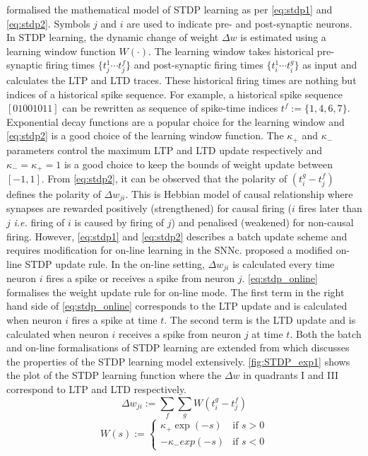 \citet{gerstner1996neuronal, song2000competitive} formalised the mathematical model of STDP learning as per \equationnames \ref{eq:stdp1} and \ref{eq:stdp2}. Symbols $j$ and $i$ are used to indicate pre- and post-synaptic neurons. In STDP learning, the dynamic change of weight $\Delta w$ is estimated using a learning window function $W(\cdot)$. The learning window takes historical pre-synaptic firing times $\{t_j^1 \cdots t_j^f\}$ and post-synaptic firing times $\{t_i^1\cdots t_i^g\}$ as input and calculates the LTP and LTD traces. These historical firing times are nothing but indices of a historical spike sequence. For example, a historical spike sequence $[01001011]$ can be rewritten as sequence of spike-time indices $t^f :=\{1, 4, 6, 7\}$. Exponential decay functions are a popular choice for the learning window and \equationname \ref{eq:stdp2} is a good choice of the learning window function. The $\kappa_+$ and $\kappa_-$ parameters control the maximum LTP and LTD update respectively and $\kappa_-=\kappa_+=1$ is a good choice to keep the bounds of weight update between $[-1, 1]$. From \equationname \ref{eq:stdp2}, it can be observed that the polarity of $(t^g_i-t^f_j)$ defines the polarity of $\Delta w_{ji}$. This is Hebbian model of causal relationship where synapses are rewarded positively (strengthened) for causal firing ($i$ fires later than $j$ \emph{i.e.} firing of $i$ is caused by firing of $j$) and penalised (weakened) for non-causal firing. However, \equationnames \ref{eq:stdp1} and \ref{eq:stdp2} describes a batch update scheme and requires modification for on-line learning in the SNNc. \citet{sjostrom2010spike} proposed a modified on-line STDP update rule. In the on-line setting, $\Delta w_{ji}$ is calculated every time neuron $i$ fires a spike or receives a spike from neuron $j$. \equationname \ref{eq:stdp_online} formalises the weight update rule for on-line mode. The first term in the right hand side of \equationname \ref{eq:stdp_online} corresponds to the LTP update and is calculated when neuron $i$ fires a spike at time $t$. The second term is the LTD update and is calculated when neuron $i$ receives a spike from neuron $j$ at time $t$. Both the batch and on-line formalisations of STDP learning are extended from \citep{sjostrom2010stdp} which discusses the properties of the STDP learning model extensively. \figurename \ref{fig:STDP_exp1} shows the plot of the STDP learning function where the $\Delta w$ in quadrants I and III correspond to LTP and LTD respectively.
\begin{equation}
\Delta w_{ji}:=\sum_{f}\sum_{g} W(t^g_i-t^f_j)
\label{eq:stdp1}
\end{equation}
\begin{equation}
W(s) :=
\left\{
\begin{array}{ll}
\kappa_+\exp(-s)  & \mbox{if } s > 0 \\
-\kappa_-exp(-s) & \mbox{if } s < 0
\end{array}
\right.
\label{eq:stdp2}
\end{equation}



